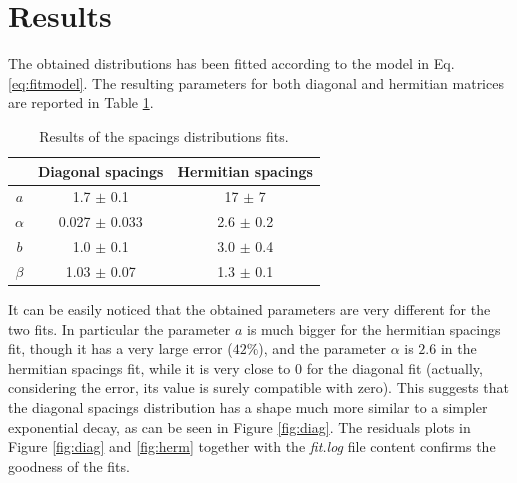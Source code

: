 \documentclass[11pt,a4paper]{article}
\begin{document}
\section{Results} %

The obtained distributions has been fitted according to the model in Eq. \ref{eq:fitmodel}. The resulting parameters for both diagonal and hermitian matrices are reported in Table \ref{tab:fitpars}.
\begin{table}[h]
	\begin{center}
		\begin{tabular}{ccc}
			\hline
			         & \textbf{Diagonal spacings} & \textbf{Hermitian spacings} \\ 
			\hline
			   \textbf{$a$}   &   1.7 $\pm$ 0.1   &     17 $\pm$ 7     \\
			\textbf{$\alpha$} & 0.027 $\pm$ 0.033 &   2.6 $\pm$ 0.2    \\
			   \textbf{$b$}   &   1.0 $\pm$ 0.1   &   3.0 $\pm$ 0.4    \\
			\textbf{$\beta$}  &  1.03 $\pm$ 0.07  &   1.3 $\pm$ 0.1    \\ 
			\hline
		\end{tabular}
	\end{center}
	\caption{Results of the spacings distributions fits.}
	\label{tab:fitpars}
\end{table} 
It can be easily noticed that the obtained parameters are very different for the two fits. 
In particular the parameter $a$ is much bigger for the hermitian spacings fit, though it has a very large error ($42\%$), and the parameter $\alpha$ is $2.6$ in the hermitian spacings fit, while it is very close to $0$ for the diagonal fit (actually, considering the error, its value is surely compatible with zero).
This suggests that the diagonal spacings distribution has a shape much more similar to a simpler exponential decay, as can be seen in Figure \ref{fig:diag}.
The residuals plots in Figure \ref{fig:diag} and \ref{fig:herm} together with the \textit{fit.log} file content confirms the goodness of the fits.
\end{document}
